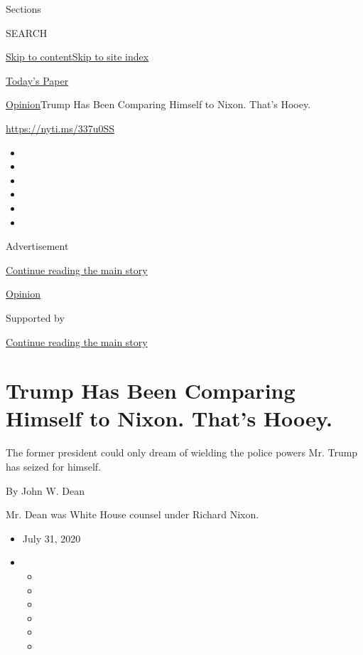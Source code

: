 Sections

SEARCH

\protect\hyperlink{site-content}{Skip to
content}\protect\hyperlink{site-index}{Skip to site index}

\href{https://myaccount.nytimes3xbfgragh.onion/auth/login?response_type=cookie\&client_id=vi}{}

\href{https://www.nytimes3xbfgragh.onion/section/todayspaper}{Today's
Paper}

\href{/section/opinion}{Opinion}\textbar{}Trump Has Been Comparing
Himself to Nixon. That's Hooey.

\url{https://nyti.ms/337u0SS}

\begin{itemize}
\item
\item
\item
\item
\item
\item
\end{itemize}

Advertisement

\protect\hyperlink{after-top}{Continue reading the main story}

\href{/section/opinion}{Opinion}

Supported by

\protect\hyperlink{after-sponsor}{Continue reading the main story}

\hypertarget{trump-has-been-comparing-himself-to-nixon-thats-hooey}{%
\section{Trump Has Been Comparing Himself to Nixon. That's
Hooey.}\label{trump-has-been-comparing-himself-to-nixon-thats-hooey}}

The former president could only dream of wielding the police powers Mr.
Trump has seized for himself.

By John W. Dean

Mr. Dean was White House counsel under Richard Nixon.

\begin{itemize}
\item
  July 31, 2020
\item
  \begin{itemize}
  \item
  \item
  \item
  \item
  \item
  \item
  \end{itemize}
\end{itemize}


